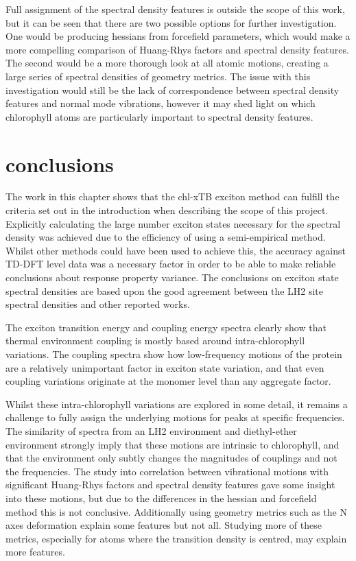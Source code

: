 Full assignment of the spectral density features is outside the scope of this work,
but it can be seen that there are two possible options for further investigation.
One would be producing hessians from forcefield parameters, which would make a more
compelling comparison of Huang-Rhys factors and spectral density features. The second
would be a more thorough look at all atomic motions, creating a large series of 
spectral densities of geometry metrics. The issue with this investigation would 
still be the lack of correspondence between spectral density features and normal
mode vibrations, however it may shed light on which chlorophyll atoms are particularly
important to spectral density features.

\section{conclusions}
\label{sec:specdens_concs}

The work in this chapter shows that the chl-xTB exciton method can fulfill the criteria
set out in the introduction when describing the scope of this project. Explicitly 
calculating the large number exciton states necessary for the spectral density was
achieved  due to the efficiency of using a semi-empirical method. Whilst other methods
could have been used to achieve this, the accuracy against TD-DFT level data was 
a necessary factor in order to be able to make reliable conclusions about response
property variance. The conclusions on exciton state spectral densities are based
upon the good agreement between the LH2 site spectral densities and other reported works.

The exciton transition energy and coupling energy spectra clearly show that thermal
environment coupling is mostly based around intra-chlorophyll variations. The coupling
spectra show how low-frequency motions of the protein are a relatively unimportant 
factor in exciton state variation, and that even coupling variations originate at
the monomer level than any aggregate factor.

Whilst these intra-chlorophyll variations are explored in some detail, it remains
a challenge to fully assign the underlying motions for peaks at specific frequencies.
The similarity of spectra from an LH2 environment and diethyl-ether environment 
strongly imply that these motions are intrinsic to chlorophyll, and that the environment
only subtly changes the magnitudes of couplings and not the frequencies. The study
into correlation between vibrational motions with significant Huang-Rhys factors 
and spectral density features gave some insight into these motions, but due to the
differences in the hessian and forcefield method this is not conclusive. Additionally 
using geometry metrics such as the N axes deformation explain some features but not
all. Studying more of these metrics, especially for atoms where the transition density
is centred, may explain more features.

